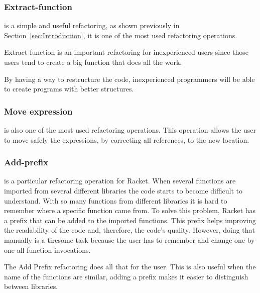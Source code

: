 \subsubsection{Extract-function}

is a simple and useful refactoring, as shown previously in Section~\ref{sec:Introduction}, it is one of the most used refactoring operations.

Extract-function is an important refactoring for inexperienced users since those users tend to create a big function that does all the work.

By having a way to restructure the code, inexperienced programmers will be able to create programs with better structures.




\subsubsection{Move expression}

is also one of the most used refactoring operations.
This operation allows the user to move safely the expressions, by correcting all references, to the new location. 



\subsubsection{Add-prefix}
is a particular refactoring operation for Racket.
When several functions are imported from several different libraries the code starts to become difficult to understand.
With so many functions from different libraries it is hard to remember where a specific function came from.
To solve this problem, Racket has a prefix that can be added to the imported functions.
This prefix helps improving the readability of the code and, therefore, the code's quality.
However, doing that manually is a tiresome task because the user has to remember and change one by one all function invocations.

The Add Prefix refactoring does all that for the user.
This is also useful when the name of the functions are similar, adding a prefix makes it easier to distinguish between libraries.





